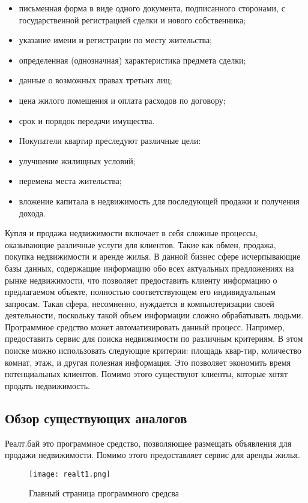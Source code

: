 \begin{itemize}
	\item письменная форма в виде одного документа, подписанного сторонами, с государственной регистрацией сделки и нового собственника;
	\item указание имени и регистрации по месту жительства;
	\item определенная (однозначная) характеристика предмета сделки;
	\item данные о возможных правах третьих лиц;
	\item цена жилого помещения и оплата расходов по договору;
	\item срок и порядок передачи имущества.
	\item Покупатели квартир преследуют различные цели:
	\item улучшение жилищных условий;
	\item перемена места жительства;
	\item вложение капитала в недвижимость для последующей продажи и получения дохода.
\end{itemize}

Купля и продажа недвижимости включает в себя сложные процессы,  оказывающие различные услуги для клиентов. Такие как обмен, продажа, покупка недвижимости и аренде жилья. В данной бизнес сфере исчерпывающие базы данных, содержащие информацию обо всех актуальных предложениях на рынке недвижимости, что позволяет предоставить клиенту информацию о предлагаемом объекте, полностью соответствующем его индивидуальным запросам. Такая сфера, несомненно, нуждается в компьютеризации своей деятельности, поскольку такой объем информации сложно обрабатывать людьми. Программное средство может автоматизировать данный процесс. Например, предоставить сервис для поиска недвижимости по различным критериям. В этом поиске можно использовать следующие критерии: площадь квар-тир, количество комнат, этаж,  и другая полезная информация. Это позволяет экономить время потенциальных клиентов. Помимо этого существуют клиенты, которые хотят продать недвижимость.


\subsection{Обзор существующих аналогов}

Реалт.бай это программное средство, позволяющее размещать объявления для продажи недвижимости. Помимо этого предоставляет сервис для аренды жилья.

\begin{figure}[!htb]
	\centering
	\texttt{[image: realt1.png]}
	\caption{ Главный страница программного средсва }
	\label{fig:arch_and_mod::realt1}
	\clearpage
\end{figure}

